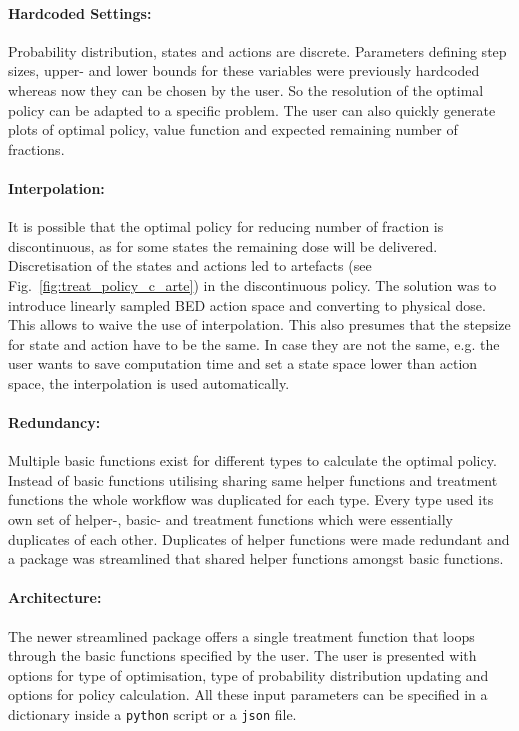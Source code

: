 \documentclass[\relativeRoot/ada.tex]{subfiles}
\begin{document}
\paragraph{Hardcoded Settings:} Probability distribution, states and actions are discrete. Parameters defining step sizes, upper- and lower bounds for these variables were previously hardcoded whereas now they can be chosen by the user. So the resolution of the optimal policy can be adapted to a specific problem. The user can also quickly generate plots of optimal policy, value function and expected remaining number of fractions.

\paragraph{Interpolation:} It is possible that the optimal policy for reducing number of fraction is discontinuous, as for some states the remaining dose will be delivered. Discretisation of the states and actions led to artefacts (see Fig.~\ref{fig:treat_policy_c_arte}) in the discontinuous policy. The solution was to introduce linearly sampled BED action space and converting to physical dose. This allows to waive the use of interpolation. This also presumes that the stepsize for state and action have to be the same. In case they are not the same, e.g. the user wants to save computation time and set a state space lower than action space, the interpolation is used automatically.

\paragraph{Redundancy:} Multiple basic functions exist for different types to calculate the optimal policy. Instead of basic functions utilising sharing same helper functions and treatment functions the whole workflow was duplicated for each type. Every type used its own set of helper-, basic- and treatment functions which were essentially duplicates of each other. Duplicates of helper functions were made redundant and a package was streamlined that shared helper functions amongst basic functions.

\paragraph{Architecture:} The newer streamlined package offers a single treatment function that loops through the basic functions specified by the user. The user is presented with options for type of optimisation, type of probability distribution updating and options for policy calculation. All these input parameters can be specified in a dictionary inside a \texttt{python} script or a \texttt{json} file.
\end{document}
